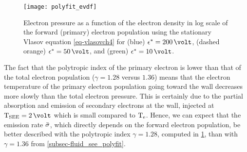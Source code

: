 \begin{figure}[hbt]
  \centering
  \texttt{[image: polyfit\_evdf]}
  \caption{Electron pressure as a function of the electron density in log scale of the forward (primary) electron population using the stationary Vlasov equation \cref{eq-vlasovch4} for (blue) $\crover=200\,\volt$, (dashed orange) $\crover=50\,\volt$, and (green) $\crover=10\,\volt$.}
  \label{fig-evdf_polyfit}
\end{figure}

The fact that the polytropic index of the primary electron is lower than that of the total electron population ($\gamma=1.28$ versus $1.36$) means that the electron temperature of the primary electron population going toward the wall decreases more slowly than the total electron pressure.
This is certainly due to the partial absorption and emission of secondary electrons at the wall, injected at $\Tsee=2\,\volt$ which is small compared to $\mathrm{T_e}$.
Hence, we can expect that the emission rate $ \bar{\sigma }$, which directly depends on the forward electron population, be better described with the polytropic index $\gamma=1.28$, computed in \cref{fig-evdf_polyfit}, than with $\gamma=1.36$ from \cref{subsec-fluid_see_polyfit}.

